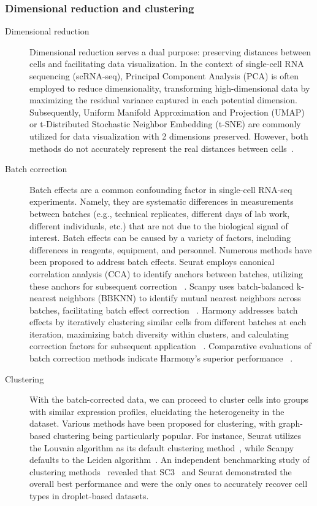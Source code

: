 \subsubsection{Dimensional reduction and clustering}
\label{background:sec2:dr_n_clustering}
\begin{description}
	\item[Dimensional reduction]
	Dimensional reduction serves a dual purpose: preserving distances between cells and facilitating data visualization. In the context of single-cell RNA sequencing (scRNA-seq), Principal Component Analysis (PCA)\citep{hotelling1933pca} is often employed to reduce dimensionality, transforming high-dimensional data by maximizing the residual variance captured in each potential dimension. Subsequently, Uniform Manifold Approximation and Projection (UMAP) or t-Distributed Stochastic Neighbor Embedding (t-SNE) are commonly utilized for data visualization with 2 dimensions preserved. However, both methods do not accurately represent the real distances between cells~\citep{mcinnes2018umap, van2008tsne}.

	\item[Batch correction]
	Batch effects are a common confounding factor in single-cell RNA-seq experiments. Namely, they are systematic differences in measurements between batches (e.g., technical replicates, different days of lab work, different individuals, etc.) that are not due to the biological signal of interest. Batch effects can be caused by a variety of factors, including differences in reagents, equipment, and personnel. Numerous methods have been proposed to address batch effects. Seurat employs canonical correlation analysis (CCA) to identify anchors between batches, utilizing these anchors for subsequent correction ~\citep{stuart2019seurat3}. Scanpy uses batch-balanced k-nearest neighbors (BBKNN) to identify mutual nearest neighbors across batches, facilitating batch effect correction ~\citep{polanski2020bbknn}. Harmony addresses batch effects by iteratively clustering similar cells from different batches at each iteration, maximizing batch diversity within clusters, and calculating correction factors for subsequent application ~\citep{korsunsky2019harmony}. Comparative evaluations of batch correction methods indicate Harmony's superior performance ~\citep{tran2020benchmark}. 
	\item[Clustering] 
	With the batch-corrected data, we can proceed to cluster cells into groups with similar expression profiles, elucidating the heterogeneity in the dataset. Various methods have been proposed for clustering, with graph-based clustering being particularly popular. For instance, Seurat utilizes the Louvain algorithm as its default clustering method~\citep{stuart2019seurat3}, while Scanpy defaults to the Leiden algorithm~\citep{traag2019louvain}. An independent benchmarking study of clustering methods~\citep{duo2018benchclustering} revealed that SC3~\citep{kiselev2017sc3} and Seurat demonstrated the overall best performance and were the only ones to accurately recover cell types in droplet-based datasets.	


\end{description}
